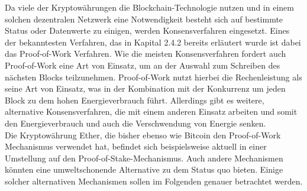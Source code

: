 Da viele der Kryptowährungen die Blockchain-Technologie nutzen und in einem solchen dezentralen Netzwerk eine Notwendigkeit besteht sich auf bestimmte Status oder Datenwerte zu einigen, werden Konsensverfahren eingesetzt. Eines der bekanntesten Verfahren, das in Kapital 2.4.2 bereits erläutert wurde ist dabei das Proof-of-Work Verfahren. Wie die meisten Konsensverfahren fordert auch Proof-of-Work eine Art von Einsatz, um an der Auswahl zum Schreiben des nächsten Blocks teilzunehmen. Proof-of-Work nutzt hierbei die Rechenleistung als seine Art von Einsatz, was in der Kombination mit der Konkurrenz um jeden Block zu dem hohen Energieverbrauch führt. Allerdings gibt es weitere, alternative Konsensverfahren, die mit einem anderen Einsatz arbeiten und somit den Energieverbrauch und auch die Verschwendung von Energie senken.\\
Die Kryptowährung Ether, die bisher ebenso wie Bitcoin den Proof-of-Work Mechanismus verwendet hat, befindet sich beispielsweise aktuell in einer Umstellung auf den Proof-of-Stake-Mechanismus. Auch andere Mechanismen könnten eine umweltschonende Alternative zu dem Status quo bieten. Einige solcher alternativen Mechanismen sollen im Folgenden genauer betrachtet werden.